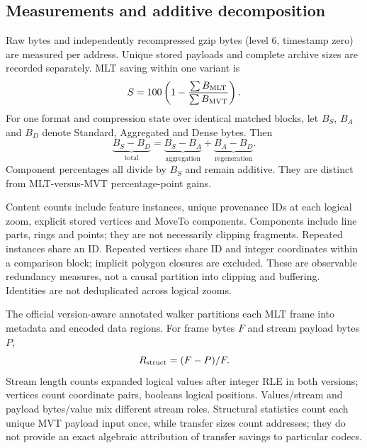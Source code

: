 \subsection{Measurements and additive decomposition}\label{sec:metrics}
Raw bytes and independently recompressed gzip bytes (level 6, timestamp zero) are
measured per address. Unique stored payloads and complete archive sizes are recorded
separately. MLT saving within one variant is
\begin{equation}\label{eq:saving}
S=100\left(1-\frac{\sum B_{\rm MLT}}{\sum B_{\rm MVT}}\right).
\end{equation}
For one format and compression state over identical matched blocks, let $B_S$,
$B_A$ and $B_D$ denote Standard, Aggregated and Dense bytes. Then
\begin{equation}\label{eq:decomposition}
\underbrace{B_S-B_D}_{\text{total}}=
\underbrace{B_S-B_A}_{\text{aggregation}}+
\underbrace{B_A-B_D}_{\text{regeneration}}.
\end{equation}
Component percentages all divide by $B_S$ and remain additive. They are distinct
from MLT-versus-MVT percentage-point gains.

Content counts include feature instances, unique provenance IDs at each logical
zoom, explicit stored vertices and MoveTo components. Components include line parts,
rings and points; they are not necessarily clipping fragments. Repeated instances
share an ID. Repeated vertices share ID and integer coordinates within a comparison
block; implicit polygon closures are excluded. These are observable redundancy
measures, not a causal partition into clipping and buffering. Identities are not
deduplicated across logical zooms.

The official version-aware annotated walker partitions each MLT frame into metadata
and encoded data regions. For frame bytes $F$ and stream payload bytes $P$,
\begin{equation}\label{eq:structural-share}R_{\rm struct}=(F-P)/F.\end{equation}
Stream length counts expanded logical values after integer RLE in both versions;
vertices count coordinate pairs, booleans logical positions. Values/stream and
payload bytes/value mix different stream roles. Structural statistics count each
unique MVT payload input once, while transfer sizes count addresses; they do not
provide an exact algebraic attribution of transfer savings to particular codecs.
